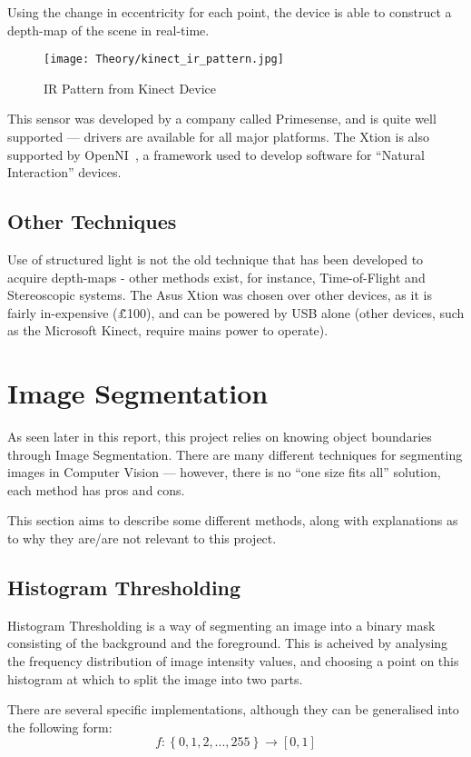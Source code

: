 Using the change in eccentricity for each point, the device is able to construct a depth-map of the scene in real-time.

\begin{figure}[H]
\centering
\texttt{[image: Theory/kinect\_ir\_pattern.jpg]}
\caption{IR Pattern from Kinect Device~\cite{primesense-irstream}}
\end{figure}

This sensor was developed by a company called Primesense, and is quite well supported --- drivers are available for all major platforms. The Xtion is also supported by OpenNI~\cite{openni}, a framework used to develop software for ``Natural Interaction'' devices. 

\subsection{Other Techniques}
Use of structured light is not the old technique that has been developed to acquire depth-maps - other methods exist, for instance, Time-of-Flight and Stereoscopic systems. The Asus Xtion was chosen over other devices, as it is fairly in-expensive (\~£100), and can be powered by USB alone (other devices, such as the Microsoft Kinect, require mains power to operate). 

\section{Image Segmentation}
As seen later in this report, this project relies on knowing object boundaries through Image Segmentation. There are many different techniques for segmenting images in Computer Vision --- however, there is no ``one size fits all'' solution, each method has pros and cons. 
\label{sec:segment}

This section aims to describe some different methods, along with explanations as to why they are/are not relevant to this project.

\subsection{Histogram Thresholding} 
Histogram Thresholding is a way of segmenting an image into a binary mask consisting of the background and the foreground. This is acheived by analysing the frequency distribution of image intensity values, and choosing a point on this histogram at which to split the image into two parts.  

There are several specific implementations, although they can be generalised into the following form:
\begin{equation}
f: \left\{{0,1,2,...,255}\right\} \rightarrow [0, 1]
\end{equation}

